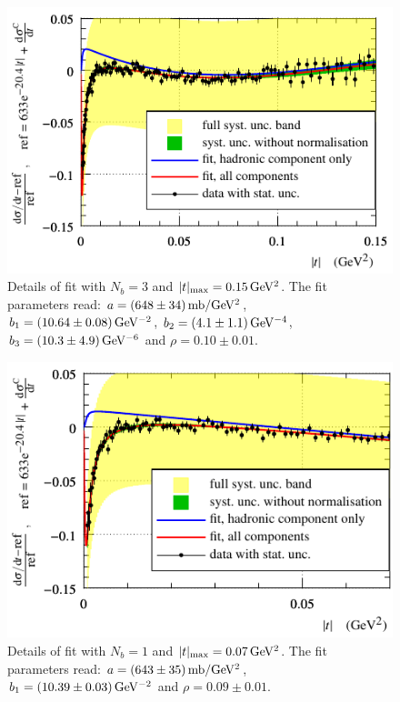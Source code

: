\begin{figure}
\begin{center}
\includegraphics{fig/fit_details_exp3_0p15.pdf}
\caption{%
Details of fit with $N_b = 3$ and $|t|_{\rm max} = 0.15\,{\rm GeV^2}$. The fit parameters read: $a = (648\pm 34)\,{\rm mb/GeV^2}$, $b_1 = (10.64 \pm 0.08)\,{\rm GeV^{-2}}$, $b_2 = (4.1 \pm 1.1)\,{\rm GeV^{-4}}$, $b_3 = (10.3 \pm 4.9)\,{\rm GeV^{-6}}$ and $\rho = 0.10 \pm 0.01$.
}
\label{fig:fit exp3 0.15}
\end{center}
\end{figure}


\begin{figure}
\begin{center}
\includegraphics{fig/fit_details_exp1_0p07.pdf}
\caption{%
Details of fit with $N_b = 1$ and $|t|_{\rm max} = 0.07\,{\rm GeV^2}$. The fit parameters read: $a = (643\pm 35)\,{\rm mb/GeV^2}$, $b_1 = (10.39 \pm 0.03)\,{\rm GeV^{-2}}$ and $\rho = 0.09 \pm 0.01$.
}
\label{fig:fit exp1 0.07}
\end{center}
\end{figure}


